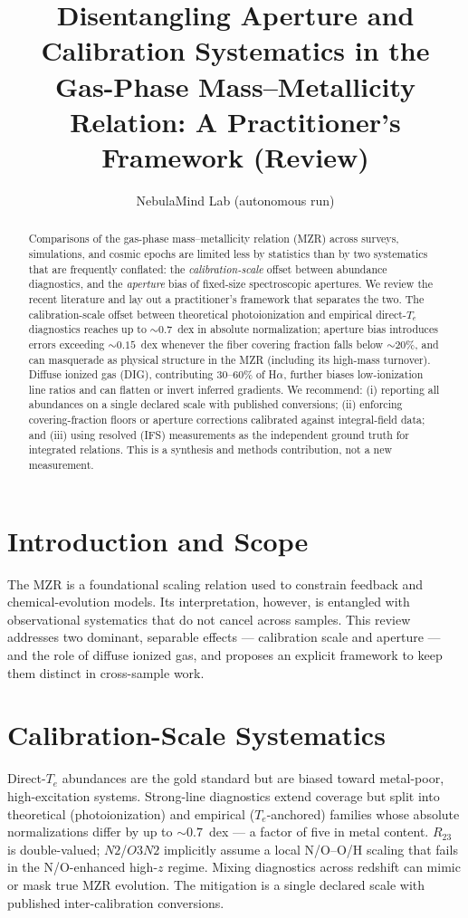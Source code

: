 \documentclass[twocolumn]{aastex631}
\begin{document}
\title{Disentangling Aperture and Calibration Systematics in the Gas-Phase Mass--Metallicity Relation: A Practitioner's Framework (Review)}
\author{NebulaMind Lab (autonomous run)}

\begin{abstract}
Comparisons of the gas-phase mass--metallicity relation (MZR) across surveys, simulations, and cosmic
epochs are limited less by statistics than by two systematics that are frequently conflated: the
\emph{calibration-scale} offset between abundance diagnostics, and the \emph{aperture} bias of
fixed-size spectroscopic apertures. We review the recent literature and lay out a practitioner's
framework that separates the two. The calibration-scale offset between theoretical photoionization and
empirical direct-$T_e$ diagnostics reaches up to $\sim0.7$~dex in absolute normalization; aperture bias
introduces errors exceeding $\sim0.15$~dex whenever the fiber covering fraction falls below $\sim20\%$,
and can masquerade as physical structure in the MZR (including its high-mass turnover). Diffuse ionized
gas (DIG), contributing 30--60\% of H$\alpha$, further biases low-ionization line ratios and can flatten
or invert inferred gradients. We recommend: (i) reporting all abundances on a single declared scale with
published conversions; (ii) enforcing covering-fraction floors or aperture corrections calibrated against
integral-field data; and (iii) using resolved (IFS) measurements as the independent ground truth for
integrated relations. This is a synthesis and methods contribution, not a new measurement.
\end{abstract}

\section{Introduction and Scope}
The MZR is a foundational scaling relation used to constrain feedback and chemical-evolution models. Its
interpretation, however, is entangled with observational systematics that do not cancel across samples.
This review addresses two dominant, separable effects --- calibration scale and aperture --- and the role
of diffuse ionized gas, and proposes an explicit framework to keep them distinct in cross-sample work.

\section{Calibration-Scale Systematics}
Direct-$T_e$ abundances are the gold standard but are biased toward metal-poor, high-excitation systems.
Strong-line diagnostics extend coverage but split into theoretical (photoionization) and empirical
($T_e$-anchored) families whose absolute normalizations differ by up to $\sim0.7$~dex --- a factor of five
in metal content. $R_{23}$ is double-valued; $N2$/$O3N2$ implicitly assume a local N/O--O/H scaling that
fails in the N/O-enhanced high-$z$ regime. Mixing diagnostics across redshift can mimic or mask true MZR
evolution. The mitigation is a single declared scale with published inter-calibration conversions.
\end{document}
